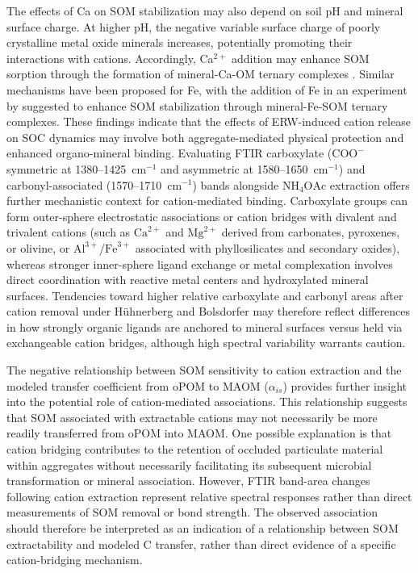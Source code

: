 \documentclass[preprint,12pt]{elsarticle}
\begin{document}
The effects of Ca on SOM stabilization may also depend on soil pH and mineral surface charge. At higher pH, the negative variable surface charge of poorly crystalline metal oxide minerals increases, potentially promoting their interactions with cations. Accordingly, Ca$^{2+}$ addition may enhance SOM sorption through the formation of mineral-Ca-OM ternary complexes \citep{rowley2021calcium,jiang2026molecular}. Similar mechanisms have been proposed for Fe, with the addition of Fe in an experiment by \citep{sun2026tradeoff} suggested to enhance SOM stabilization through mineral-Fe-SOM ternary complexes. These findings indicate that the effects of ERW-induced cation release on SOC dynamics may involve both aggregate-mediated physical protection and enhanced organo-mineral binding. Evaluating FTIR carboxylate ($\mathrm{COO}^{-}$ symmetric at 1380--1425~cm$^{-1}$ and asymmetric at 1580--1650~cm$^{-1}$) and carbonyl-associated (1570--1710~cm$^{-1}$) bands alongside $\mathrm{NH}_{4}\mathrm{OAc}$ extraction offers further mechanistic context for cation-mediated binding. Carboxylate groups can form outer-sphere electrostatic associations or cation bridges with divalent and trivalent cations (such as $\mathrm{Ca}^{2+}$ and $\mathrm{Mg}^{2+}$ derived from carbonates, pyroxenes, or olivine, or $\mathrm{Al}^{3+}$/$\mathrm{Fe}^{3+}$ associated with phyllosilicates and secondary oxides), whereas stronger inner-sphere ligand exchange or metal complexation involves direct coordination with reactive metal centers and hydroxylated mineral surfaces. Tendencies toward higher relative carboxylate and carbonyl areas after cation removal under H\"uhnerberg and Bolsdorfer may therefore reflect differences in how strongly organic ligands are anchored to mineral surfaces versus held via exchangeable cation bridges, although high spectral variability warrants caution.

The negative relationship between SOM sensitivity to cation extraction and the modeled transfer coefficient from oPOM to MAOM ($\alpha_{is}$) provides further insight into the potential role of cation-mediated associations. This relationship suggests that SOM associated with extractable cations may not necessarily be more readily transferred from oPOM into MAOM. One possible explanation is that cation bridging contributes to the retention of occluded particulate material within aggregates without necessarily facilitating its subsequent microbial transformation or mineral association. However, FTIR band-area changes following cation extraction represent relative spectral responses rather than direct measurements of SOM removal or bond strength. The observed association should therefore be interpreted as an indication of a relationship between SOM extractability and modeled C transfer, rather than direct evidence of a specific cation-bridging mechanism.
\end{document}
